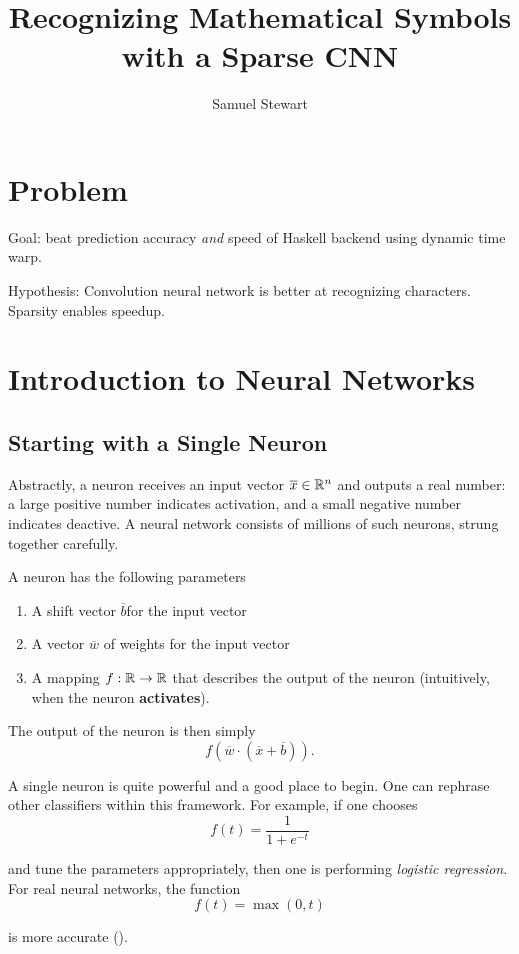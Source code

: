 \documentclass[12pt,letterpaper,boxed]{article}
\author{Samuel Stewart}
\title{Recognizing Mathematical Symbols with a Sparse CNN}
\begin{document}
\section{Problem}
Goal: beat prediction accuracy \emph{and} speed of Haskell backend using dynamic time warp.

Hypothesis: Convolution neural network is better at recognizing characters. Sparsity enables speedup.

\section{Introduction to Neural Networks}

\subsection{Starting with a Single Neuron}
Abstractly, a neuron receives an input vector $\overline{x} \in {\mathbb{R}}^n$ and outputs a real number: a large positive number indicates activation, and a small negative number indicates deactive. A neural network consists of millions of such neurons, strung together carefully. 


A neuron has the following parameters

\begin{enumerate}
	\item A shift vector $\overline{b}$for the input vector
	\item A vector $\overline{w}$ of weights for the input vector
	\item A mapping $f : {\mathbb{R}} \to {\mathbb{R}}$ that describes the output of the neuron (intuitively, when the neuron \textbf{activates}).
\end{enumerate}

The output of the neuron is then simply
\[
	f(\overline{w} \cdot (\overline{x} + \overline{b})).
\]

A single neuron is quite powerful and a good place to begin. One can rephrase other classifiers \cite{andrej2017} within this framework. For example, if one chooses
\[
	f(t) = \frac{1}{1 + e^{-t}}
\]

and tune the parameters appropriately, then one is performing \textit{logistic regression}. For real neural networks, the function
\[
	f(t) = \max(0, t)
\]

is more accurate (\cite{andrej2017}). 
\end{document}
